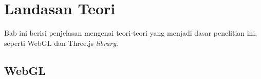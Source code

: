 \chapter{Landasan Teori}
\label{chap:teori}
Bab ini berisi penjelasan mengenai teori-teori yang menjadi dasar penelitian ini, seperti WebGL dan Three.js \textit{library}.

\section{WebGL}
\label{sec:webgl} 



